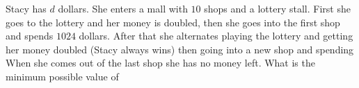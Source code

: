 Stacy has $d$ dollars. She enters a mall with $10$ shops and a lottery stall. First she goes to the lottery and her money is doubled, then she goes into the first shop and spends $1024$ dollars. After that she alternates playing the lottery and getting her money doubled (Stacy always wins) then going into a new shop and spending  When she comes out of the last shop she has no money left. What is the minimum possible value of 
